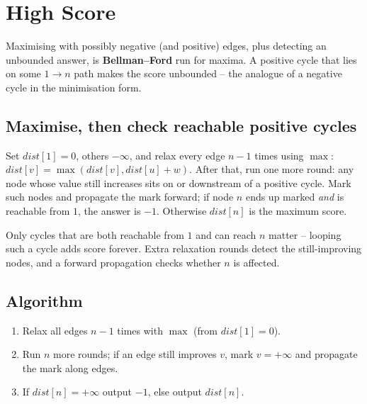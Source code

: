 \section{High Score}
\label{sec:cses-high-score}


\begin{patternbox}
Maximising with possibly negative (and positive) edges, plus detecting an
unbounded answer, is \textbf{Bellman--Ford} run for maxima. A positive
cycle that lies on some $1\to n$ path makes the score unbounded -- the
analogue of a negative cycle in the minimisation form.
\end{patternbox}

\subsection*{Maximise, then check reachable positive cycles}

Set $\textit{dist}[1]=0$, others $-\infty$, and relax every edge $n-1$
times using $\max$: $\textit{dist}[v]=\max(\textit{dist}[v],
\textit{dist}[u]+w)$. After that, run one more round: any node whose value
still increases sits on or downstream of a positive cycle. Mark such nodes
and propagate the mark forward; if node $n$ ends up marked \emph{and} is
reachable from $1$, the answer is $-1$. Otherwise $\textit{dist}[n]$ is the
maximum score.

\begin{ideabox}
Only cycles that are both reachable from $1$ and can reach $n$ matter --
looping such a cycle adds score forever. Extra relaxation rounds detect the
still-improving nodes, and a forward propagation checks whether $n$ is
affected.
\end{ideabox}

\subsection*{Algorithm}

\begin{enumerate}
  \item Relax all edges $n-1$ times with $\max$ (from $\textit{dist}[1]=0$).
  \item Run $n$ more rounds; if an edge still improves $v$, mark $v=+\infty$
        and propagate the mark along edges.
  \item If $\textit{dist}[n]=+\infty$ output $-1$, else output
        $\textit{dist}[n]$.
\end{enumerate}

